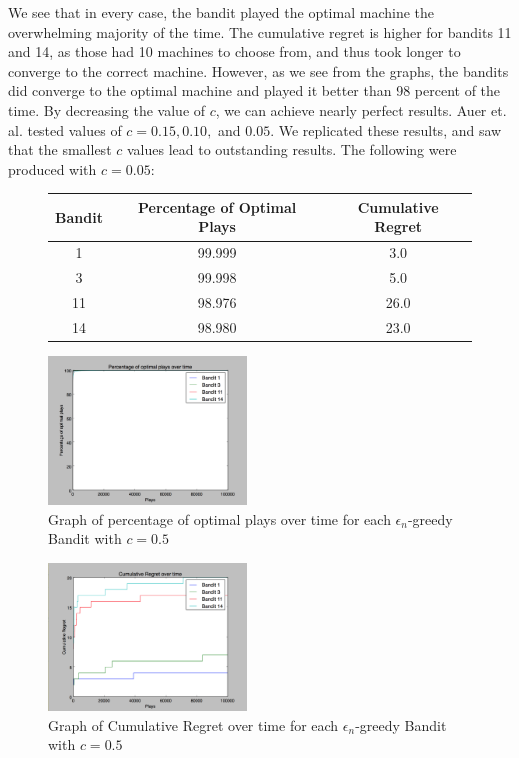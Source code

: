 We see that in every case, the bandit played the optimal machine the overwhelming majority of the time. The cumulative regret is higher for bandits 11 and 14, as those had 10 machines to choose from, and thus took longer to converge to the correct machine. However, as we see from the graphs, the bandits did converge to the optimal machine and played it better than 98 percent of the time. By decreasing the value of $c$, we can achieve nearly perfect results. Auer et. al. tested values  of $c = 0.15, 0.10,$ and $0.05$. We replicated these results, and saw that the smallest $c$ values lead to outstanding results. The following were produced with $c = 0.05$:
\begin{figure}[htb]
  \centering
  \begin{tabular}{|c|c|c|} 
    \hline \hline 
    Bandit & Percentage of Optimal Plays &  Cumulative Regret \\ 
    \hline 
     1 & 99.999 & 3.0 \\
     3 & 99.998 & 5.0 \\
     11 & 98.976  & 26.0 \\
     14 & 98.980 & 23.0 \\
    \hline \hline
  \end{tabular}
  \label{tab:Statistics for $\epsilon_n$-greedy Bandits with $c = 0.5$}
\end{figure}

\begin{figure}[htb]
  \centering 
  \includegraphics[width=0.47\textwidth]{plays_c_05.png}
  \caption{Graph of percentage of optimal plays over time for each $\epsilon_n$-greedy Bandit with $c = 0.5$}
  \label{fig:$\epsilon_n$-greedy Percentage of optimal plays over time ($c = 0.5$)}
\end{figure}
\begin{figure}[htb]
  \centering 
  \includegraphics[width=0.47\textwidth]{regret_c_05.png}
  \caption{Graph of Cumulative Regret over time for each $\epsilon_n$-greedy Bandit with $c = 0.5$}
  \label{fig:$\epsilon_n$-greedy Cumulative Regret over time ($c = 0.5$)}
\end{figure}

